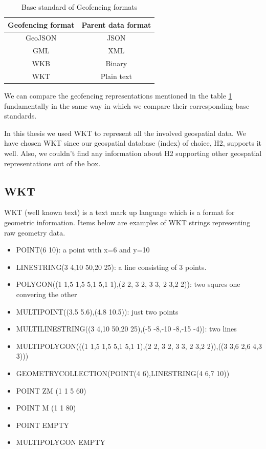 \documentclass[a4]{report}
\begin{document}
    \begin{table}[h!]
        \centering
        \begin{tabular}{|c|c|}
            \hline
            Geofencing format & Parent data format \\
            \hline
            GeoJSON           & JSON               \\
            GML               & XML                \\
            WKB               & Binary             \\
            WKT               & Plain text         \\
            \hline
        \end{tabular}
        \caption{Base standard of Geofencing formats}
        \label{table:geofencing-formats}
    \end{table}

    We can compare the geofencing representations mentioned in the table \ref{table:geofencing-formats} fundamentally
    in the same way in which we compare their corresponding base standards.

    In this thesis we used WKT to represent all the involved geospatial data.
    We have chosen WKT since our geospatial database (index) of choice, H2\cite{h2}, supports it well.
    Also, we couldn't find any information about H2 supporting other geospatial representations out of the box.

    \subsection{WKT}
    WKT (well known text) is a text mark up language which is a format for geometric information.
    Items below are examples of WKT strings representing raw geometry data.
    \begin{itemize}
        \item POINT(6 10): a point with x=6 and y=10
        \item LINESTRING(3 4,10 50,20 25): a line consisting of 3 points.
        \item POLYGON((1 1,5 1,5 5,1 5,1 1),(2 2, 3 2, 3 3, 2 3,2 2)): two squres one convering the other
        \item MULTIPOINT((3.5 5.6),(4.8 10.5)): just two points
        \item MULTILINESTRING((3 4,10 50,20 25),(-5 -8,-10 -8,-15 -4)): two lines
        \item MULTIPOLYGON(((1 1,5 1,5 5,1 5,1 1),(2 2, 3 2, 3 3, 2 3,2 2)),((3 3,6 2,6 4,3 3)))
        \item GEOMETRYCOLLECTION(POINT(4 6),LINESTRING(4 6,7 10))
        \item POINT ZM (1 1 5 60)
        \item POINT M (1 1 80)
        \item POINT EMPTY
        \item MULTIPOLYGON EMPTY
    \end{itemize}
\end{document}
